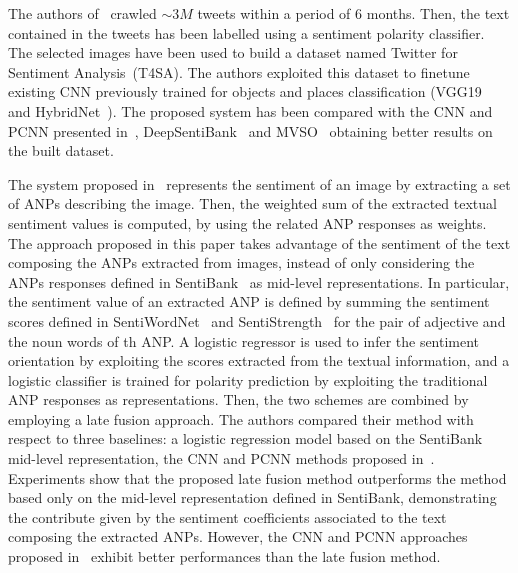
The authors of~\cite{vadicamo2017cross} crawled $\sim3M$ tweets within a period of 6 months.
Then, the text contained in the tweets has been labelled using a sentiment polarity classifier. 
The selected images have been used to build a dataset named Twitter for Sentiment Analysis~(T4SA). 
The authors exploited this dataset to finetune existing CNN previously trained for objects and places classification (VGG19~\cite{simonyan2014very} and HybridNet~\cite{zhou2014learning}).
The proposed system has been compared with the CNN and PCNN presented in~\cite{you2015robust}, DeepSentiBank~\cite{chen2014deepsentibank} and MVSO~\cite{jou2015visual} obtaining better results on the built dataset.

The system proposed in~\cite{li2018image} represents the sentiment of an image by extracting a set of ANPs describing the image. Then, the weighted sum of the extracted textual sentiment values is computed, by using the related ANP responses as weights. The approach proposed in this paper takes advantage of the sentiment of the text composing the ANPs extracted from images, instead of only considering the ANPs responses defined in SentiBank~\cite{borth2013large} as mid-level representations. 
In particular, the sentiment value of an extracted ANP is defined by summing the sentiment scores defined in SentiWordNet~\cite{esuli2006sentiwordnet} and SentiStrength~\cite{thelwall2010sentiment} for the pair of adjective and the noun words of th ANP. 
A logistic regressor is used to infer the sentiment orientation by exploiting the scores extracted from the textual information, and a logistic classifier is trained for polarity prediction by exploiting the traditional ANP responses as representations. Then, the two schemes are combined by employing a late fusion approach.
The authors compared their method with respect to three baselines: a logistic regression model based on the SentiBank mid-level representation, the CNN and PCNN methods proposed in~\cite{you2015robust}.
Experiments show that the proposed late fusion method outperforms the method based only on the mid-level representation defined in SentiBank, demonstrating the contribute given by the sentiment coefficients associated to the text composing the extracted ANPs. However, the CNN and PCNN approaches proposed in~\cite{you2015robust} exhibit better performances than the late fusion method.

